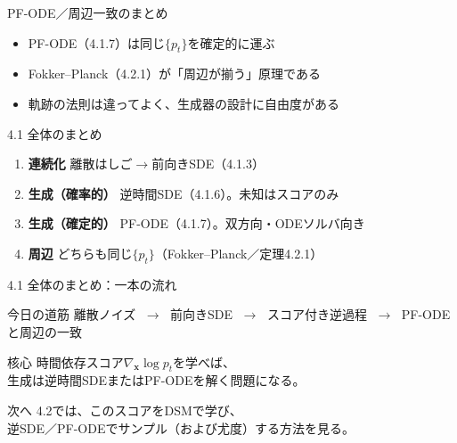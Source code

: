\asmain
\begin{frame}{PF-ODE／周辺一致のまとめ}
    \begin{itemize}
        \item PF-ODE（4.1.7）は同じ$\{p_t\}$を確定的に運ぶ
        \item Fokker--Planck（4.2.1）が「周辺が揃う」原理である
        \item 軌跡の法則は違ってよく、生成器の設計に自由度がある
    \end{itemize}
\end{frame}
\asmain
\begin{frame}{4.1 全体のまとめ}
    \begin{enumerate}
        \item \textbf{連続化}
        離散はしご$\to$前向きSDE（4.1.3）
        \item \textbf{生成（確率的）}
        逆時間SDE（4.1.6）。未知はスコアのみ
        \item \textbf{生成（確定的）}
        PF-ODE（4.1.7）。双方向・ODEソルバ向き
        \item \textbf{周辺}
        どちらも同じ$\{p_t\}$（Fokker--Planck／定理4.2.1）
    \end{enumerate}
\end{frame}
\asmain
\begin{frame}{4.1 全体のまとめ：一本の流れ}
    \begin{block}{今日の道筋}
        離散ノイズ
        $\;\to\;$
        前向きSDE
        $\;\to\;$
        スコア付き逆過程
        $\;\to\;$
        PF-ODEと周辺の一致
    \end{block}
    \begin{block}{核心}
        時間依存スコア$\nabla_{\bm{x}}\log p_t$を学べば、\\
        生成は逆時間SDEまたはPF-ODEを解く問題になる。
    \end{block}
    \begin{block}{次へ}
        4.2では、このスコアをDSMで学び、\\
        逆SDE／PF-ODEでサンプル（および尤度）する方法を見る。
    \end{block}
\end{frame}
